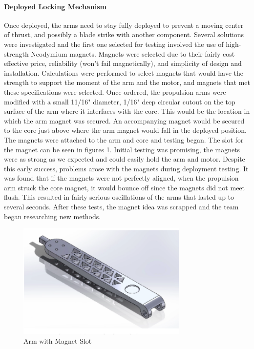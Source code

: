 \paragraph{Deployed Locking Mechanism}
\label{armdeployedlockignmechanism}
Once deployed, the arms need to stay fully deployed to prevent a moving center of thrust, and possibly a blade strike with another component. Several solutions were investigated and the first one selected for testing involved the use of high-strength Neodymium magnets. Magnets were selected due to their fairly cost effective price, reliability (won't fail magnetically), and simplicity of design and installation. Calculations were performed to select magnets that would have the strength to support the moment of the arm and the motor, and magnets that met these specifications were selected. Once ordered, the propulsion arms were modified with a small 11/16" diameter, 1/16" deep circular cutout on the top surface of the arm where it interfaces with the core. This would be the location in which the arm magnet was secured. An accompanying magnet would be secured to the core just above where the arm magnet would fall in the deployed position. The magnets were attached to the arm and core and testing began. The slot for the magnet can be seen in figures \ref{fig:armwspeed}. Initial testing was promising, the magnets were as strong as we expected and could easily hold the arm and motor. Despite this early success, problems arose with the magnets during deployment testing. It was found that if the magnets were not perfectly aligned, when the propulsion arm struck the core magnet, it would bounce off since the magnets did not meet flush. This resulted in fairly serious oscillations of the arms that lasted up to several seconds. After these tests, the magnet idea was scrapped and the team began researching new methods. 

\begin{figure}[H]
    \centering
    \includegraphics[width=0.75\textwidth]{src/figs/armwithspeed.png}
    \caption{Arm with Magnet Slot}
    \label{fig:armwspeed}
\end{figure}

